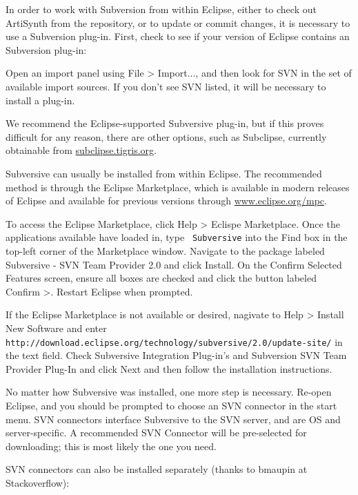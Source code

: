 \documentclass{article}
\begin{document}
\label{SubversionPlugIn}

In order to work with Subversion from within Eclipse, either to check
out ArtiSynth from the repository, or to update or commit changes, it
is necessary to use a Subversion plug-in. First, check to see if your
version of Eclipse contains an Subversion plug-in:

Open an import panel using {\sf File > Import...}, and then look for
{\sf SVN} in the set of available import sources. If you don't see SVN
listed, it will be necessary to install a plug-in.

We recommend the Eclipse-supported Subversive plug-in, but if this
proves difficult for any reason, there are other options, such as
Subclipse, currently obtainable from
\href{http://subclipse.tigris.org/servlets/ProjectProcess?pageID=p4wYuA}
{subclipse.tigris.org}.

Subversive can usually be installed from within Eclipse. The
recommended method is through the Eclipse Marketplace, which is
available in modern releases of Eclipse and available for previous
versions through \href{http://www.eclipse.org/mpc/}{www.eclipse.org/mpc}.

To access the Eclipse Marketplace, click {\sf Help > Eclispe}
Marketplace. Once the applications available have loaded in, type {\tt
Subversive} into the {\sf Find} box in the top-left corner of the
Marketplace window. Navigate to the package labeled {\sf Subversive -
SVN Team Provider 2.0} and click {\sf Install}. On the {\sf Confirm
Selected Features} screen, ensure all boxes are checked and click the
button labeled {\sf Confirm >}. Restart Eclipse when prompted.

If the Eclipse Marketplace is not available or desired, nagivate to
{\sf Help > Install New Software} and enter
{\tt http://download.eclipse.org/technology/subversive/2.0/update-site/}
in the text field. Check {\sf Subversive Integration Plug-in's} and
{\sf Subversion SVN Team Provider Plug-In} and click {\sf Next} and
then follow the installation instructions.

No matter how Subversive was installed, one more step is
necessary. Re-open Eclipse, and you should be prompted to choose an SVN
connector in the start menu.  SVN connectors interface
Subversive to the SVN server, and are OS and server-specific. A
recommended SVN Connector will be pre-selected for downloading; this
is most likely the one you need.

SVN connectors can also be installed separately (thanks to bmaupin at
Stackoverflow):
\end{document}
